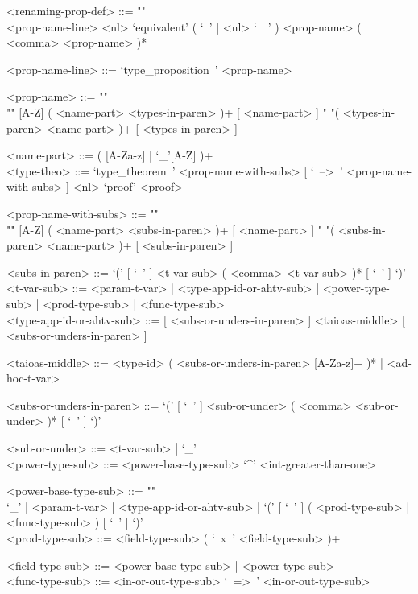 \documentclass{article}
\begin{document}
\begin{grammar}
<renaming-prop-def> ::= ""\\
<prop-name-line> <nl>
`equivalent' ( `\ ' | <nl> `\ \ ' ) <prop-name> ( <comma> <prop-name> )*

<prop-name-line> ::= `type_proposition\ ' <prop-name>

<prop-name> ::=  ""\\""
[A-Z] ( <name-part> <types-in-paren> )+ [ <name-part> ]
\alt " "( <types-in-paren> <name-part> )+ [ <types-in-paren> ]

<name-part> ::= ( [A-Za-z] | `_'[A-Z] )+
\\

\newpage
<type-theo> ::=
`type_theorem\ ' <prop-name-with-subs> [ `\ -->\ ' <prop-name-with-subs> ] <nl>
`proof' <proof>

<prop-name-with-subs> ::=  ""\\""
[A-Z] ( <name-part> <subs-in-paren> )+ [ <name-part> ]
\alt " "( <subs-in-paren> <name-part> )+ [ <subs-in-paren> ]

<subs-in-paren> ::=
`(' [ `\ ' ] <t-var-sub> ( <comma> <t-var-sub> )* [ `\ ' ] `)'
\\

<t-var-sub> ::=
<param-t-var> | <type-app-id-or-ahtv-sub> | <power-type-sub> | <prod-type-sub> |
<func-type-sub>
\\

<type-app-id-or-ahtv-sub> ::=
[ <subs-or-unders-in-paren> ] <taioas-middle> [ <subs-or-unders-in-paren> ]

<taioas-middle> ::=
<type-id> ( <subs-or-unders-in-paren> [A-Za-z]+ )* | <ad-hoc-t-var>

<subs-or-unders-in-paren> ::=
`(' [ `\ ' ] <sub-or-under> ( <comma> <sub-or-under> )* [ `\ ' ] `)'

<sub-or-under> ::= <t-var-sub> | `_'
\\

<power-type-sub> ::= <power-base-type-sub> `^' <int-greater-than-one>

<power-base-type-sub> ::= ""\\
`_' | <param-t-var> | <type-app-id-or-ahtv-sub> |
`(' [ `\ ' ] ( <prod-type-sub> | <func-type-sub> ) [ `\ ' ] `)'
\\

<prod-type-sub> ::= <field-type-sub> ( `\ x\ ' <field-type-sub> )+

<field-type-sub> ::= <power-base-type-sub> | <power-type-sub>
\\

<func-type-sub> ::= <in-or-out-type-sub> `\ =>\ ' <in-or-out-type-sub>


\end{grammar}
\end{document}
